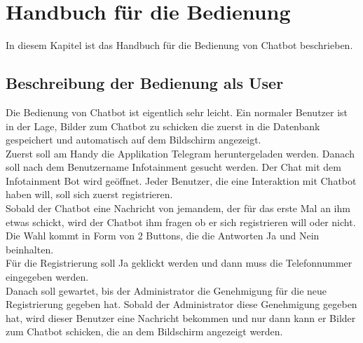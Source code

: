 \section{Handbuch für die Bedienung}
In diesem Kapitel ist das Handbuch für die Bedienung von Chatbot beschrieben.
\subsection{Beschreibung der Bedienung als User}
Die Bedienung von Chatbot ist eigentlich sehr leicht. Ein normaler Benutzer ist in der Lage, Bilder zum Chatbot zu schicken die zuerst in die Datenbank gespeichert und automatisch auf dem Bildschirm angezeigt. \\
Zuerst soll am Handy die Applikation Telegram heruntergeladen werden. Danach soll nach dem Benutzername Infotainment gesucht werden. Der Chat mit dem Infotainment Bot wird geöffnet. 
Jeder Benutzer, die eine Interaktion mit Chatbot haben will, soll sich zuerst registrieren. \\
Sobald der Chatbot eine Nachricht von jemandem, der für das erste Mal an ihm etwas schickt, wird der Chatbot ihm fragen ob er sich registrieren will oder nicht. Die Wahl kommt in Form von 2 Buttons, die die Antworten Ja und Nein beinhalten.\\
Für die Registrierung soll Ja geklickt werden und dann muss die Telefonnummer eingegeben werden. \\
Danach soll gewartet, bis der Administrator die Genehmigung für die neue Registrierung gegeben hat. Sobald der Administrator diese Genehmigung gegeben hat, wird dieser Benutzer eine Nachricht bekommen und nur dann kann er Bilder zum Chatbot schicken, die an dem Bildschirm angezeigt werden.
